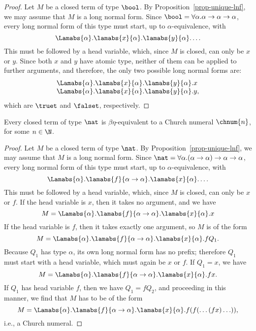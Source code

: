 \documentclass[12pt]{article}
\begin{document}
\begin{proof}
  Let $M$ be a closed term of type $\bool$. By
  Proposition~\ref{prop-unique-lnf}, we may assume that $M$ is a long
  normal form. Since $\bool = \forall\alpha.\alpha\to\alpha\to\alpha$,
  every long normal form of this type must start, up to
  $\alpha$-equivalence, with
  \[ \Lamabs{\alpha}.\lamabs{x}{\alpha}.\lamabs{y}{\alpha}.\ldots
  \]
  This must be followed by a head variable, which, since $M$ is
  closed, can only be $x$ or $y$. Since both $x$ and $y$ have atomic
  type, neither of them can be applied to further arguments, and
  therefore, the only two possible long normal forms are:
  \[ \begin{array}{l}
    \Lamabs{\alpha}.\lamabs{x}{\alpha}.\lamabs{y}{\alpha}.x \\
    \Lamabs{\alpha}.\lamabs{x}{\alpha}.\lamabs{y}{\alpha}.y,
  \end{array}
  \]
  which are $\truet$ and $\falset$, respectively.\eot
\end{proof}

\begin{proposition}\label{prop-unique-nat}
  Every closed term of type $\nat$ is $\beta\eta$-equivalent to a
  Church numeral $\chnum{n}$, for some $n\in\N$.
\end{proposition}

\begin{proof}
  Let $M$ be a closed term of type $\nat$. By
  Proposition~\ref{prop-unique-lnf}, we may assume that $M$ is a long
  normal form. Since
  $\nat=\forall\alpha.(\alpha\to\alpha)\to\alpha\to\alpha$, every long
  normal form of this type must start, up to $\alpha$-equivalence,
  with
  \[
  \Lamabs{\alpha}.\lamabs{f}{\alpha\to\alpha}.\lamabs{x}{\alpha}.\ldots
  \]
  This must be followed by a head variable, which, since $M$ is
  closed, can only be $x$ or $f$. If the head variable is $x$, then it
  takes no argument, and we have 
  \[ M = \Lamabs{\alpha}.\lamabs{f}{\alpha\to\alpha}.\lamabs{x}{\alpha}.x
  \]
  If the head variable is $f$, then it takes exactly one argument, so
  $M$ is of the form
  \[ M = \Lamabs{\alpha}.\lamabs{f}{\alpha\to\alpha}.\lamabs{x}{\alpha}.fQ_1.
  \]
  Because $Q_1$ has type $\alpha$, its own long normal form has no
  prefix; therefore $Q_1$ must start with a head variable, which must
  again be $x$ or $f$. If $Q_1=x$, we have
  \[ M = \Lamabs{\alpha}.\lamabs{f}{\alpha\to\alpha}.\lamabs{x}{\alpha}.fx.
  \]
  If $Q_1$ has head variable $f$, then we have $Q_1=fQ_2$, and
  proceeding in this manner, we find that $M$ has to be of the form
  \[ M =
  \Lamabs{\alpha}.\lamabs{f}{\alpha\to\alpha}.\lamabs{x}{\alpha}.f(f(\ldots(fx)\ldots)),
  \]
  i.e., a Church numeral.\eot
\end{proof}
\end{document}
